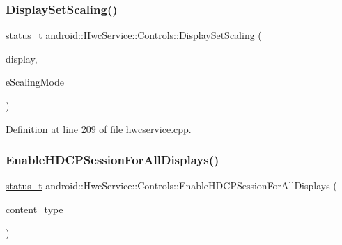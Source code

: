 \subsubsection{\texorpdfstring{Display\+Set\+Scaling()}{DisplaySetScaling()}}
{\footnotesize\ttfamily \mbox{\hyperlink{hwcserviceapi_8h_a3806fb2027d9a316d8ca8d9b8b8eb96f}{status\+\_\+t}} android\+::\+Hwc\+Service\+::\+Controls\+::\+Display\+Set\+Scaling (\begin{DoxyParamCaption}\item[{uint32\+\_\+t}]{display,  }\item[{\mbox{\hyperlink{hwcserviceapi_8h_acdadfd5e7f15097833789174e442083f}{E\+Hwcs\+Scaling\+Mode}}}]{e\+Scaling\+Mode }\end{DoxyParamCaption})}



Definition at line 209 of file hwcservice.\+cpp.


\begin{DoxyCode}{0}
\end{DoxyCode}
\mbox{\label{classandroid_1_1HwcService_1_1Controls_ae703b526fe5b7a155afba4ff1b476a29}} 
\subsubsection{\texorpdfstring{Enable\+H\+D\+C\+P\+Session\+For\+All\+Displays()}{EnableHDCPSessionForAllDisplays()}}
{\footnotesize\ttfamily \mbox{\hyperlink{hwcserviceapi_8h_a3806fb2027d9a316d8ca8d9b8b8eb96f}{status\+\_\+t}} android\+::\+Hwc\+Service\+::\+Controls\+::\+Enable\+H\+D\+C\+P\+Session\+For\+All\+Displays (\begin{DoxyParamCaption}\item[{\mbox{\hyperlink{hwcserviceapi_8h_a69e9b3a54e4c8e504845398c66eab655}{E\+Hwcs\+Content\+Type}}}]{content\+\_\+type }\end{DoxyParamCaption})}



